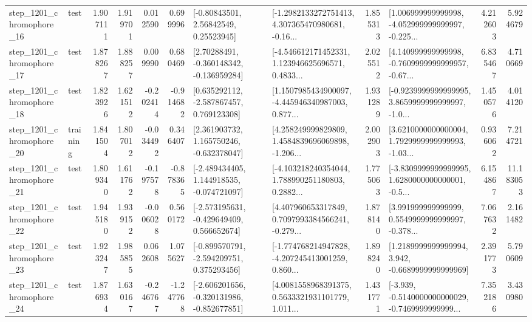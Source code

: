 \begin{tabular}{llrrrrllrlrr}
 step\_1201\_chromophore\_16 &      test &      1.907111 &    1.919701 &      0.012590 &  0.699996 &       [-0.80843501, 2.56842549, 0.25523945] &  [-1.2982133272751413, 4.307365470980681, -0.16... &       1.855313 &  [1.006999999999998, -4.052999999999997, -0.225... &            4.212603 &          5.924679 \\
 step\_1201\_chromophore\_17 &      test &      1.878267 &    1.888257 &      0.009990 &  0.680469 &    [2.70288491, -0.360148342, -0.136959284] &  [-4.546612171452331, 1.123946625696571, 0.4833... &       2.025512 &  [4.140999999999998, -0.7609999999999957, -0.67... &            6.835467 &          4.710669 \\
 step\_1201\_chromophore\_18 &      test &      1.823926 &    1.621512 &     -0.202414 & -0.914682 &    [0.635292112, -2.587867457, 0.769123308] &  [1.1507985434900097, -4.445946340987003, 0.877... &       1.931289 &  [-0.9239999999999995, 3.8659999999999997, -1.0... &            1.450576 &          4.014120 \\
 step\_1201\_chromophore\_20 &  training &      1.841504 &    1.807012 &     -0.034492 &  0.346407 &    [2.361903732, 1.165750246, -0.632378047] &  [4.258249999829809, 1.4584839696069898, -1.206... &       2.002903 &  [3.6210000000000004, 1.7929999999999993, -1.03... &            0.936062 &          7.214721 \\
 step\_1201\_chromophore\_21 &      test &      1.809340 &    1.611762 &     -0.197578 & -0.878365 &   [-2.489434405, 1.144918535, -0.074721097] &  [-4.103218240354044, 1.788990251180803, 0.2882... &       1.775063 &  [-3.8309999999999995, 1.6280000000000001, -0.5... &            6.154867 &         11.183053 \\
 step\_1201\_chromophore\_22 &      test &      1.945180 &    1.939152 &     -0.006028 &  0.560172 &   [-2.573195631, -0.429649409, 0.566652674] &  [4.407960653317849, 0.7097993384566241, -0.279... &       1.878140 &  [3.991999999999999, 0.5549999999999997, -0.378... &            7.067632 &          2.161482 \\
 step\_1201\_chromophore\_23 &      test &      1.923247 &    1.985855 &      0.062608 &  1.075627 &   [-0.899570791, -2.594209751, 0.375293456] &  [-1.774768214947828, -4.207245413001259, 0.860... &       1.898240 &   [1.2189999999999994, 3.942, -0.6689999999999969] &            2.391773 &          5.790609 \\
 step\_1201\_chromophore\_24 &      test &      1.876934 &    1.630167 &     -0.246767 & -1.247768 &  [-2.606201656, -0.320131986, -0.852677851] &  [4.0081558968391375, 0.5633321931101779, 1.011... &       1.431771 &  [-3.939, -0.5140000000000029, -0.7469999999999... &            7.352186 &          3.430980 \\

\end{tabular}
